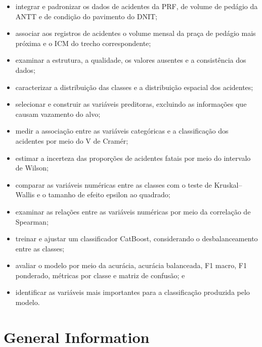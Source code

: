 \documentclass[12pt]{article}
\begin{document}
\begin{itemize}
\item integrar e padronizar os dados de acidentes da PRF, de volume de pedágio da ANTT e de condição do pavimento do DNIT;

\item associar aos registros de acidentes o volume mensal da praça de pedágio mais próxima e o ICM do trecho correspondente;

\item examinar a estrutura, a qualidade, os valores ausentes e a consistência dos dados;

\item caracterizar a distribuição das classes e a distribuição espacial dos acidentes;

\item selecionar e construir as variáveis preditoras, excluindo as informações que causam vazamento do alvo;

\item medir a associação entre as variáveis categóricas e a classificação dos acidentes por meio do V de Cramér;

\item estimar a incerteza das proporções de acidentes fatais por meio do intervalo de Wilson;

\item comparar as variáveis numéricas entre as classes com o teste de Kruskal--Wallis e o tamanho de efeito epsilon ao quadrado;

\item examinar as relações entre as variáveis numéricas por meio da correlação de Spearman;

\item treinar e ajustar um classificador CatBoost, considerando o desbalanceamento entre as classes;

\item avaliar o modelo por meio da acurácia, acurácia balanceada, F1 macro, F1 ponderado, métricas por classe e matriz de confusão; e

\item identificar as variáveis mais importantes para a classificação produzida pelo modelo.

\end{itemize}

\section{General Information}
\end{document}

